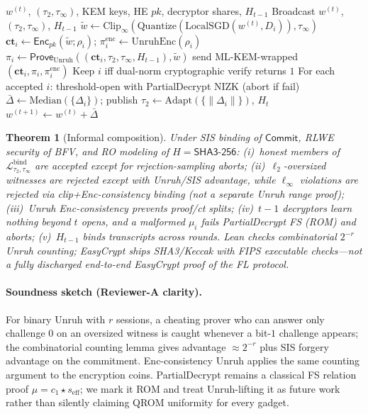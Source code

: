 \documentclass[conference]{IEEEtran}
\newtheorem{theorem}{Theorem}
\newcommand{\norm}[1]{\lVert #1 \rVert}
\newcommand{\Enc}{\mathsf{Enc}}
\newcommand{\Prove}{\mathsf{Prove}}
\newcommand{\Commit}{\mathsf{Commit}}
\begin{document}
\begin{algorithm}[t]
\caption{ZKFL-PQ round (innovation composition)}
\label{alg:target}
\begin{algorithmic}[1]
\Require $w^{(t)}$, $(\tau_2,\tau_\infty)$, KEM keys, HE $pk$, decryptor shares, $H_{t-1}$
\State Broadcast $w^{(t)}$, $(\tau_2,\tau_\infty)$, $H_{t-1}$
  \State $\tilde{w}\gets\mathrm{Clip}_\infty(\mathrm{Quantize}(\mathrm{LocalSGD}(w^{(t)},D_i)),\tau_\infty)$
  \State $\mathbf{ct}_i\gets\Enc_{pk}(\tilde{w};\rho_i)$; $\pi_i^{\mathrm{enc}}\gets\mathrm{UnruhEnc}(\rho_i)$
  \State $\pi_i\gets\Prove_{\mathrm{Unruh}}((\mathbf{ct}_i,\tau_2,\tau_\infty,H_{t-1}),\tilde{w})$
  \State send ML-KEM-wrapped $(\mathbf{ct}_i,\pi_i,\pi_i^{\mathrm{enc}})$
\EndFor
\State Keep $i$ iff dual-norm cryptographic verify returns $1$
\State For each accepted $i$: threshold-open with PartialDecrypt NIZK (abort if fail)
\State $\bar{\Delta}\gets\mathrm{Median}(\{\Delta_i\})$; publish $\tau_2\!\leftarrow\!\mathrm{Adapt}(\{\norm{\Delta_i}\})$, $H_t$
\State $w^{(t+1)}\gets w^{(t)}+\bar{\Delta}$
\end{algorithmic}
\end{algorithm}

\begin{theorem}[Informal composition]
Under SIS binding of $\Commit$, RLWE security of BFV, and RO modeling of $H{=}\mathsf{SHA3\text{-}256}$: (i)~honest members of $\mathcal{L}_{\tau_2,\tau_\infty}^{\mathrm{bind}}$ are accepted except for rejection-sampling aborts; (ii)~$\ell_2$-oversized witnesses are rejected except with Unruh/SIS advantage, while $\ell_\infty$ violations are rejected via clip+Enc-consistency binding (not a separate Unruh range proof); (iii)~Unruh Enc-consistency prevents proof/ct splits; (iv)~$t{-}1$ decryptors learn nothing beyond $t$ opens, and a malformed $\mu_i$ fails PartialDecrypt FS (ROM) and aborts; (v)~$H_{t-1}$ binds transcripts across rounds. Lean checks combinatorial $2^{-r}$ Unruh counting; EasyCrypt ships SHA3/Keccak with FIPS executable checks---not a fully discharged end-to-end EasyCrypt proof of the FL protocol.
\end{theorem}

\paragraph{Soundness sketch (Reviewer-A clarity).}
For binary Unruh with $r$ sessions, a cheating prover who can answer only challenge $0$ on an oversized witness is caught whenever a bit-$1$ challenge appears; the combinatorial counting lemma gives advantage $\approx 2^{-r}$ plus SIS forgery advantage on the commitment. Enc-consistency Unruh applies the same counting argument to the encryption coins. PartialDecrypt remains a classical FS relation proof $\mu=c_1\star s_{\mathrm{eff}}$; we mark it ROM and treat Unruh-lifting it as future work rather than silently claiming QROM uniformity for every gadget.
\end{document}
